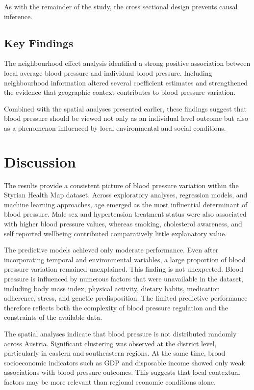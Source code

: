 \documentclass[12pt,a4paper]{article}
\begin{document}
As with the remainder of the study, the cross sectional design prevents causal inference.

\subsection{Key Findings}

The neighbourhood effect analysis identified a strong positive association between local average blood pressure and individual blood pressure. Including neighbourhood information altered several coefficient estimates and strengthened the evidence that geographic context contributes to blood pressure variation.

Combined with the spatial analyses presented earlier, these findings suggest that blood pressure should be viewed not only as an individual level outcome but also as a phenomenon influenced by local environmental and social conditions.


\section{Discussion}

The results provide a consistent picture of blood pressure variation within the Styrian Health Map dataset. Across exploratory analyses, regression models, and machine learning approaches, age emerged as the most influential determinant of blood pressure. Male sex and hypertension treatment status were also associated with higher blood pressure values, whereas smoking, cholesterol awareness, and self reported wellbeing contributed comparatively little explanatory value.

The predictive models achieved only moderate performance. Even after incorporating temporal and environmental variables, a large proportion of blood pressure variation remained unexplained. This finding is not unexpected. Blood pressure is influenced by numerous factors that were unavailable in the dataset, including body mass index, physical activity, dietary habits, medication adherence, stress, and genetic predisposition. The limited predictive performance therefore reflects both the complexity of blood pressure regulation and the constraints of the available data.

The spatial analyses indicate that blood pressure is not distributed randomly across Austria. Significant clustering was observed at the district level, particularly in eastern and southeastern regions. At the same time, broad socioeconomic indicators such as GDP and disposable income showed only weak associations with blood pressure outcomes. This suggests that local contextual factors may be more relevant than regional economic conditions alone.
\end{document}
